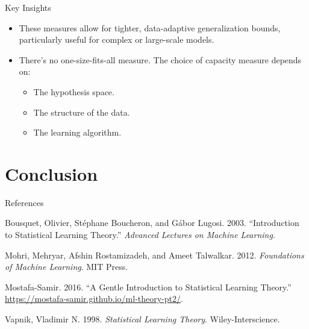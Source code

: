 \documentclass[
  ignorenonframetext,
]{beamer}
\providecommand{\tightlist}{%
  \setlength{\itemsep}{0pt}\setlength{\parskip}{0pt}}\usepackage{longtable,booktabs,array}
\newlength{\cslhangindent}
\newenvironment{CSLReferences}[2] %
 {\begin{list}{}{%
  \setlength{\itemindent}{0pt}
  \setlength{\leftmargin}{0pt}
  \setlength{\parsep}{0pt}
  \ifodd #1
   \setlength{\leftmargin}{\cslhangindent}
   \setlength{\itemindent}{-1\cslhangindent}
  \fi
  \setlength{\itemsep}{#2\baselineskip}}}
 {\end{list}}
\begin{document}
\begin{frame}
\begin{block}{Key Insights}
\label{key-insights-4}
\begin{itemize}
\tightlist
\item
  These measures allow for tighter, data-adaptive generalization bounds,
  particularly useful for complex or large-scale models.
\item
  There's no one-size-fits-all measure. The choice of capacity measure
  depends on:

  \begin{itemize}
  \tightlist
  \item
    The hypothesis space.
  \item
    The structure of the data.
  \item
    The learning algorithm.
  \end{itemize}
\end{itemize}
\end{block}
\end{frame}

\section{Conclusion}\label{conclusion}

\begin{frame}
\begin{block}{References}
\label{references}
\label{refs}
\begin{CSLReferences}{1}{0}
Bousquet, Olivier, Stéphane Boucheron, and Gábor Lugosi. 2003.
{``Introduction to Statistical Learning Theory.''} \emph{Advanced
Lectures on Machine Learning}.

Mohri, Mehryar, Afshin Rostamizadeh, and Ameet Talwalkar. 2012.
\emph{Foundations of Machine Learning}. MIT Press.

Mostafa-Samir. 2016. {``A Gentle Introduction to Statistical Learning
Theory.''} \url{https://mostafa-samir.github.io/ml-theory-pt2/}.

Vapnik, Vladimir N. 1998. \emph{Statistical Learning Theory}.
Wiley-Interscience.

\end{CSLReferences}
\end{block}
\end{frame}
\end{document}
